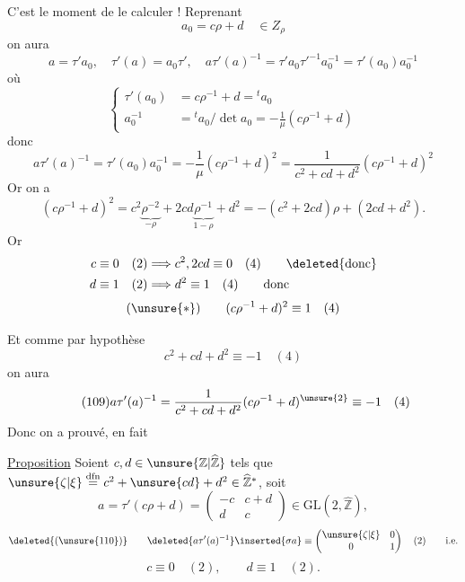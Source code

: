 C'est le moment de le calculer ! Reprenant
\[
a_0=c\rho+d\quad\in Z_\rho
\]
on aura
\[
a=\tau'a_0,\quad \tau'(a)=a_0\tau',\quad
a\tau'(a)^{-1}=\tau'a_0\tau'^{-1}a_0^{-1}=\tau'(a_0)a_0^{-1}
\]
où
\[
\left\{\begin{aligned}
\tau'(a_0)&=c\rho^{-1}+d={}^{t}a_0\\
a_0^{-1}&={}^{t}a_0/\det a_0=-\frac1\mu(c\rho^{-1}+d)
\end{aligned}\right.
\]
donc
\[
a\tau'(a)^{-1}=\tau'(a_0)a_0^{-1}
=-\frac1\mu(c\rho^{-1}+d)^2
=\frac1{c^2+cd+d^2}(c\rho^{-1}+d)^2
\]
Or on a
\[
(c\rho^{-1}+d)^2
=c^2\underbrace{\rho^{-2}}_{-\rho}
+2cd\underbrace{\rho^{-1}}_{1-\rho}+d^2
=-(c^2+2cd)\rho+(2cd+d^2).
\]
Or 
\[
\begin{aligned}
c\equiv0\quad(2)&\Longrightarrow c^2,2cd\equiv0\quad(4)
\qquad\text{\deleted{donc}}\\
d\equiv1\quad(2)&\Longrightarrow d^2\equiv1\quad(4)
\qquad\text{donc}
\end{aligned}
\]
\[
(\unsure{*})\qquad (c\rho^{-1}+d)^2\equiv1\quad(4)
\]


Et comme par hypothèse
\[
c^2+cd+d^2\equiv-1\quad(4)
\]
on aura
\[
\tag{109}
a\tau'(a)^{-1}=\frac1{c^2+cd+d^2}(c\rho^{-1}+d)^{\unsure{2}}
\equiv-1\quad(4)
\]
Donc on a prouvé, en fait

\uline{Proposition} Soient $c,d\in\unsure{\mathbb Z|\widehat{\mathbb Z}}$
tels que $\unsure{\zeta|\xi}\overset{\mathrm{dfn}}{=}c^2+\unsure{cd}+d^2
\in\widehat{\mathbb Z}^{*}$, soit
\[
a=\tau'(c\rho+d)=\begin{pmatrix}-c&c+d\\d&c\end{pmatrix}
\in\mathrm{GL}(2,\widehat{\mathbb Z}),
\]
\[
\deleted{(\unsure{110})}\qquad
\deleted{a\tau'(a)^{-1}}\inserted{\sigma a}
\equiv\begin{pmatrix}\unsure{\zeta|\xi}&0\\0&1\end{pmatrix}
\quad(2)\qquad\text{i.e.}
\]
\[
c\equiv0\quad(2),\qquad d\equiv1\quad(2).
\]

